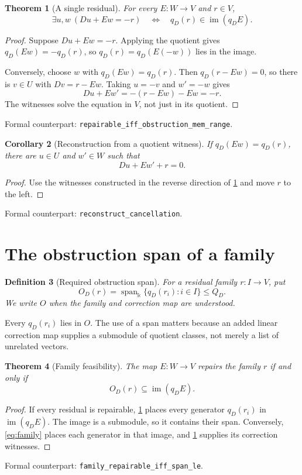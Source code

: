 \documentclass[11pt,letterpaper,oneside,openany]{book}
\theoremstyle{quiet}
\newtheorem{theorem}{Theorem}[chapter]
\newtheorem{corollary}[theorem]{Corollary}
\newtheorem{definition}[theorem]{Definition}
\newcommand{\kk}{\Bbbk}
\DeclareMathOperator{\im}{im}
\DeclareMathOperator{\Span}{span}
\newcommand{\formal}[1]{\par\nobreak\begingroup\footnotesize\color{Slate}\sffamily Formal counterpart: \normalfont\nolinkurl{#1}.\par\endgroup}
\begin{document}
\begin{theorem}[A single residual]\label{thm:single}
For every $E:W\to V$ and $r\in V$,
\begin{equation}\label{eq:single}
\exists u,w\ (Du+Ew=-r)
\quad\Longleftrightarrow\quad
q_D(r)\in\im(q_DE).
\end{equation}
\end{theorem}
\begin{proof}
Suppose $Du+Ew=-r$. Applying the quotient gives $q_D(Ew)=-q_D(r)$, so $q_D(r)=q_D(E(-w))$ lies in the image.

Conversely, choose $w$ with $q_D(Ew)=q_D(r)$. Then $q_D(r-Ew)=0$, so there is $v\in U$ with $Dv=r-Ew$. Taking $u=-v$ and $w'=-w$ gives
\[
Du+Ew'=-(r-Ew)-Ew=-r.
\]
The witnesses solve the equation in $V$, not just in its quotient.
\end{proof}
\formal{repairable_iff_obstruction_mem_range}

\begin{corollary}[Reconstruction from a quotient witness]\label{cor:reconstruct}
If $q_D(Ew)=q_D(r)$, there are $u\in U$ and $w'\in W$ such that
\[
Du+Ew'+r=0.
\]
\end{corollary}
\begin{proof}
Use the witnesses constructed in the reverse direction of \cref{thm:single} and move $r$ to the left.
\end{proof}
\formal{reconstruct_cancellation}

\section{The obstruction span of a family}
\begin{definition}[Required obstruction span]\label{def:span}
For a residual family $r:I\to V$, put
\[
O_D(r)=\Span_{\kk}\{q_D(r_i):i\in I\}\leq Q_D.
\]
We write $O$ when the family and correction map are understood.
\end{definition}

Every $q_D(r_i)$ lies in $O$. The use of a span matters because an added linear correction map supplies a submodule of quotient classes, not merely a list of unrelated vectors.

\begin{theorem}[Family feasibility]\label{thm:family}
The map $E:W\to V$ repairs the family $r$ if and only if
\begin{equation}\label{eq:family}
O_D(r)\subseteq\im(q_DE).
\end{equation}
\end{theorem}
\begin{proof}
If every residual is repairable, \cref{thm:single} places every generator $q_D(r_i)$ in $\im(q_DE)$. The image is a submodule, so it contains their span. Conversely, \eqref{eq:family} places each generator in that image, and \cref{thm:single} supplies its correction witnesses.
\end{proof}
\formal{family_repairable_iff_span_le}
\end{document}
